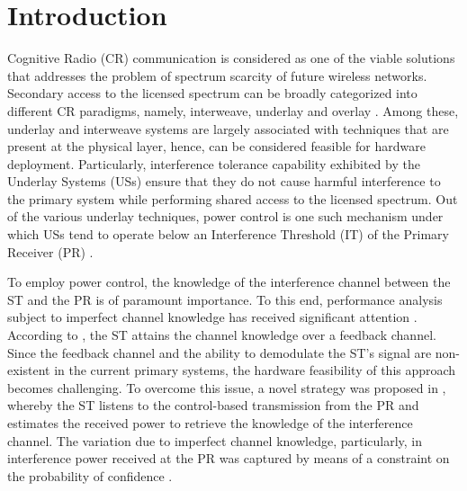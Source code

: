 \documentclass[12pt, draftclsnofoot, onecolumn]{IEEEtran}
\begin{document}
\section{Introduction}%
Cognitive Radio (CR) communication is considered as one of the viable solutions that addresses the problem of spectrum scarcity of future wireless networks. Secondary access to the licensed spectrum can be broadly categorized into different CR paradigms, namely, interweave, underlay and overlay \cite{Goldsmith09}. Among these, underlay and interweave systems are largely associated with techniques that are present at the physical layer, hence, can be considered feasible for hardware deployment. %
Particularly, interference tolerance capability exhibited by the Underlay Systems (USs) ensure that they do not cause harmful interference to the primary system while performing shared access to the licensed spectrum. Out of the various underlay techniques, power control is one such mechanism under which USs tend to operate below an Interference Threshold (IT) of the Primary Receiver (PR) \cite{Xing07}. 


To employ power control, the knowledge of the interference channel between the ST and the PR is of paramount importance. To this end, performance analysis subject to imperfect channel knowledge has received significant attention \cite{Sharma15, Suraweera10, Kim12, Kaushik15}. According to \cite{Suraweera10, Kim12}, the ST attains the channel knowledge over a feedback channel. Since the feedback channel and the ability to demodulate the ST's signal are non-existent in the current primary systems, the hardware feasibility of this approach becomes challenging. To overcome this issue, a novel strategy was proposed in \cite{Kaushik15}, whereby the ST listens to the control-based transmission from the PR and estimates the received power to retrieve the knowledge of the interference channel. The variation due to imperfect channel knowledge, particularly, in interference power received at the PR was captured by means of a constraint on the probability of confidence \cite{Kaushik15}. 
\end{document}
